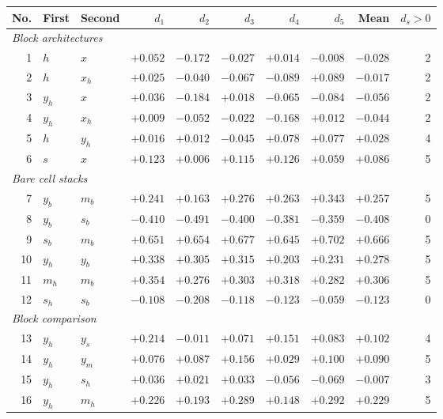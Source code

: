 \begin{tabular}{rllrrrrrrr}\toprule
No. & First & Second & $d_1$ & $d_2$ & $d_3$ & $d_4$ & $d_5$ & Mean & $d_s>0$ \\
\midrule\multicolumn{10}{l}{\textit{Block architectures}} \\
1 & $h$ & $x$ & $+0.052$ & $-0.172$ & $-0.027$ & $+0.014$ & $-0.008$ & $-0.028$ & 2 \\
2 & $h$ & $x_h$ & $+0.025$ & $-0.040$ & $-0.067$ & $-0.089$ & $+0.089$ & $-0.017$ & 2 \\
3 & $y_h$ & $x$ & $+0.036$ & $-0.184$ & $+0.018$ & $-0.065$ & $-0.084$ & $-0.056$ & 2 \\
4 & $y_h$ & $x_h$ & $+0.009$ & $-0.052$ & $-0.022$ & $-0.168$ & $+0.012$ & $-0.044$ & 2 \\
5 & $h$ & $y_h$ & $+0.016$ & $+0.012$ & $-0.045$ & $+0.078$ & $+0.077$ & $+0.028$ & 4 \\
6 & $s$ & $x$ & $+0.123$ & $+0.006$ & $+0.115$ & $+0.126$ & $+0.059$ & $+0.086$ & 5 \\
\midrule\multicolumn{10}{l}{\textit{Bare cell stacks}} \\
7 & $y_b$ & $m_b$ & $+0.241$ & $+0.163$ & $+0.276$ & $+0.263$ & $+0.343$ & $+0.257$ & 5 \\
8 & $y_b$ & $s_b$ & $-0.410$ & $-0.491$ & $-0.400$ & $-0.381$ & $-0.359$ & $-0.408$ & 0 \\
9 & $s_b$ & $m_b$ & $+0.651$ & $+0.654$ & $+0.677$ & $+0.645$ & $+0.702$ & $+0.666$ & 5 \\
10 & $y_h$ & $y_b$ & $+0.338$ & $+0.305$ & $+0.315$ & $+0.203$ & $+0.231$ & $+0.278$ & 5 \\
11 & $m_h$ & $m_b$ & $+0.354$ & $+0.276$ & $+0.303$ & $+0.318$ & $+0.282$ & $+0.306$ & 5 \\
12 & $s_h$ & $s_b$ & $-0.108$ & $-0.208$ & $-0.118$ & $-0.123$ & $-0.059$ & $-0.123$ & 0 \\
\midrule\multicolumn{10}{l}{\textit{Block comparison}} \\
13 & $y_h$ & $y_s$ & $+0.214$ & $-0.011$ & $+0.071$ & $+0.151$ & $+0.083$ & $+0.102$ & 4 \\
14 & $y_h$ & $y_m$ & $+0.076$ & $+0.087$ & $+0.156$ & $+0.029$ & $+0.100$ & $+0.090$ & 5 \\
15 & $y_h$ & $s_h$ & $+0.036$ & $+0.021$ & $+0.033$ & $-0.056$ & $-0.069$ & $-0.007$ & 3 \\
16 & $y_h$ & $m_h$ & $+0.226$ & $+0.193$ & $+0.289$ & $+0.148$ & $+0.292$ & $+0.229$ & 5 \\

\end{tabular}
